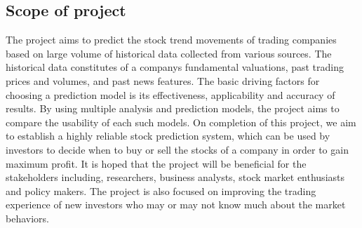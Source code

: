 \subsection{Scope of project}
The project aims to predict the stock trend movements of trading companies based on large volume of historical data collected from various sources. The historical data constitutes of a companys fundamental valuations, past trading prices and volumes, and past news features. The basic driving factors for choosing a prediction model is its effectiveness, applicability and accuracy of results. By using multiple analysis and prediction models, the project aims to compare the usability of each such models. On completion of this project, we aim to establish a highly reliable stock prediction system, which can be used by investors to decide when to buy or sell the stocks of a company in order to gain maximum profit. It is hoped that the project will be beneficial for the stakeholders including, researchers, business analysts, stock market enthusiasts and policy makers. The project is also focused on improving the trading experience of new investors who may or may not know much about the market behaviors. 

